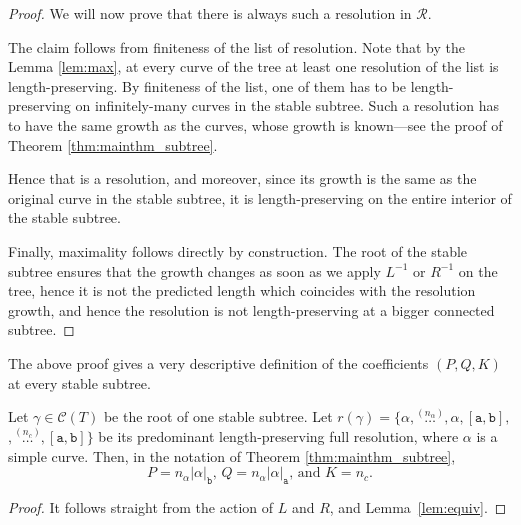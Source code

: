 \documentclass{article}
\begin{document}
\begin{proof}
		We will now prove that there is always such a resolution in $\mathcal{R}$.
		
		The claim follows from finiteness of the list of resolution. Note that by the Lemma \ref{lem:max}, at every curve of the tree at least one resolution of the list is length-preserving. By finiteness of the list, one of them has to be length-preserving on infinitely-many curves in the stable subtree. Such a resolution has to have the same growth as the curves, whose growth is known---see the proof of Theorem \ref{thm:mainthm_subtree}. 
		
		Hence that is a resolution, and moreover, since its growth is the same as the original curve in the stable subtree, it is length-preserving on the entire interior of the stable subtree.
		
		Finally, maximality follows directly by construction. The root of the stable subtree ensures that the growth changes as soon as we apply $L^{-1}$ or $R^{-1}$ on the tree, hence it is not the predicted length which coincides with the resolution growth, and hence the resolution is not length-preserving at a bigger connected subtree.
	\end{proof}
	
	
	The above proof gives a very descriptive definition of the coefficients $(P,Q,K)$ at every stable subtree.
	
	\begin{corollary}\label{cor:coeff} Let $\gamma\in\mathcal{C}(T)$ be the root of one stable subtree. Let $r(\gamma)=\{\alpha,\overset{(n_\alpha)}{\hdots},\alpha, [\mathtt{a},\mathtt{b}],$ $,\overset{(n_c)}{\hdots},[\mathtt{a},\mathtt{b}]\}$ be its predominant length-preserving full resolution, where $\alpha$ is a simple curve. Then, in the notation of Theorem \ref{thm:mainthm_subtree},
		\[
		P=n_\alpha|\alpha|_\mathtt{b}, \, Q=n_\alpha|\alpha|_\mathtt{a},\,\text{and } K=n_c.
		\]
	\end{corollary}
	
	\begin{proof}
		It follows straight from the action of $L$ and $R$, and Lemma~\ref{lem:equiv}. 
	\end{proof}
	
\end{document}
